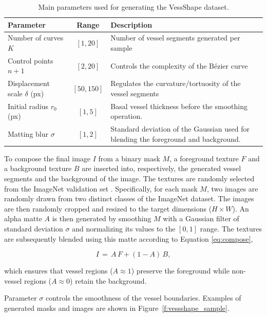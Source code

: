 \documentclass[%
reprint,
nofootinbib,
 amsmath,amssymb,
aps,
superscriptaddress,
showkeys,
longbibliography
]{revtex4-1}
\begin{document}
\begin{table}[t]
\caption{Main parameters used for generating the VessShape dataset.}
\label{tab:vessshape_params}
\centering
\begin{tabularx}{\textwidth}{l c X}
\hline
    \textbf{Parameter} & \textbf{Range} & \textbf{Description} \\
\hline
Number of curves $K$ & $[1,20]$ & Number of vessel segments generated per sample \\
Control points $n{+}1$ & $[2,20]$ & Controls the complexity of the Bézier curve \\
Displacement scale $\delta$ (px) & $[50,150]$ & Regulates the curvature/tortuosity of the vessel segments \\
Initial radius $r_{0}$ (px) & $[1,5]$ & Basal vessel thickness before the smoothing operation. \\
Matting blur $\sigma$ & $[1,2]$ & Standard deviation of the Gaussian used for blending the foreground and background. \\

\hline
\end{tabularx}
\end{table}

To compose the final image $I$ from a binary mask $M$, a foreground texture $F$ and a background texture $B$ are inserted into, respectively, the generated vessel segments and the background of the image. The textures are randomly selected from the ImageNet validation set \cite{JiaDeng2009}. Specifically, for each mask $M$, two images are randomly drawn from two distinct classes of the ImageNet dataset. The images are then randomly cropped and resized to the target dimensions ($H \times W$). An alpha matte $A$ is then generated by smoothing $M$ with a Gaussian filter of standard deviation $\sigma$ and normalizing its values to the $[0, 1]$ range. The textures are subsequently blended using this matte according to Equation \ref{eq:compose},

\begin{equation}
I \,=\, A\,F + (1-A)\,B,
\label{eq:compose}
\end{equation}

which ensures that vessel regions ($A \approx 1$) preserve the foreground while non-vessel regions ($A \approx 0$) retain the background. 

Parameter $\sigma$ controls the smoothness of the vessel boundaries. Examples of generated masks and images are shown in Figure~\ref{f:vessshape_sample}.
\end{document}
